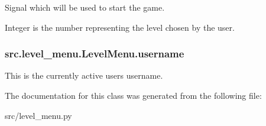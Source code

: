 Signal which will be used to start the game. 

Integer is the number representing the level chosen by the user. \hypertarget{classsrc_1_1level__menu_1_1_level_menu_aee1d2148e23a2908c72c4a8f8ad0a98f}{}
\subsubsection[{username}]{\setlength{\rightskip}{0pt plus 5cm}src.\+level\+\_\+menu.\+Level\+Menu.\+username}\label{classsrc_1_1level__menu_1_1_level_menu_aee1d2148e23a2908c72c4a8f8ad0a98f}


This is the currently active user\textquotesingle{}s username. 



The documentation for this class was generated from the following file\+:\begin{DoxyCompactItemize}
\item 
src/level\+\_\+menu.\+py\end{DoxyCompactItemize}
